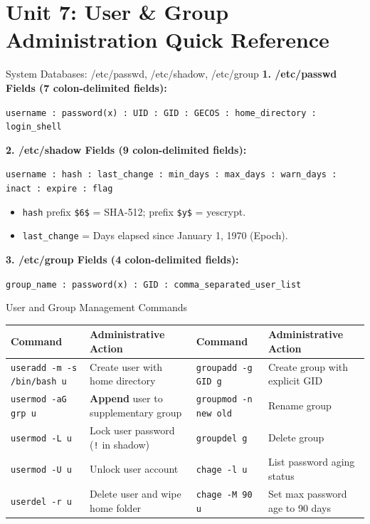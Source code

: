 \chapter{Unit 7: User \& Group Administration Quick Reference}

\begin{cheatbox}{System Databases: /etc/passwd, /etc/shadow, /etc/group}
\textbf{1. /etc/passwd Fields (7 colon-delimited fields):}
\begin{center}
\texttt{username : password(x) : UID : GID : GECOS : home\_directory : login\_shell}
\end{center}

\textbf{2. /etc/shadow Fields (9 colon-delimited fields):}
\begin{center}
\texttt{username : hash : last\_change : min\_days : max\_days : warn\_days : inact : expire : flag}
\end{center}
\begin{itemize}[leftmargin=1.5em]
    \item \texttt{hash} prefix \texttt{\$6\$} = SHA-512; prefix \texttt{\$y\$} = yescrypt.
    \item \texttt{last\_change} = Days elapsed since January 1, 1970 (Epoch).
\end{itemize}

\textbf{3. /etc/group Fields (4 colon-delimited fields):}
\begin{center}
\texttt{group\_name : password(x) : GID : comma\_separated\_user\_list}
\end{center}
\end{cheatbox}

\begin{syntaxbox}{User and Group Management Commands}
\begin{tabularx}{\linewidth}{l X l X}
\toprule
\textbf{Command} & \textbf{Administrative Action} & \textbf{Command} & \textbf{Administrative Action} \\
\midrule
\texttt{useradd -m -s /bin/bash u} & Create user with home directory & \texttt{groupadd -g GID g} & Create group with explicit GID \\
\texttt{usermod -aG grp u} & \textbf{Append} user to supplementary group & \texttt{groupmod -n new old} & Rename group \\
\texttt{usermod -L u} & Lock user password (\texttt{!} in shadow) & \texttt{groupdel g} & Delete group \\
\texttt{usermod -U u} & Unlock user account & \texttt{chage -l u} & List password aging status \\
\texttt{userdel -r u} & Delete user and wipe home folder & \texttt{chage -M 90 u} & Set max password age to 90 days \\
\bottomrule
\end{tabularx}
\end{syntaxbox}

